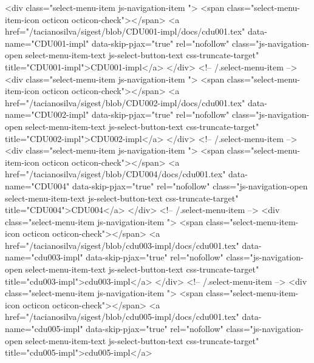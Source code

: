            <div class="select-menu-item js-navigation-item ">
              <span class="select-menu-item-icon octicon octicon-check"></span>
              <a href="/tacianosilva/sigest/blob/CDU001-impl/docs/cdu001.tex"
                 data-name="CDU001-impl"
                 data-skip-pjax="true"
                 rel="nofollow"
                 class="js-navigation-open select-menu-item-text js-select-button-text css-truncate-target"
                 title="CDU001-impl">CDU001-impl</a>
            </div> <!-- /.select-menu-item -->
            <div class="select-menu-item js-navigation-item ">
              <span class="select-menu-item-icon octicon octicon-check"></span>
              <a href="/tacianosilva/sigest/blob/CDU002-impl/docs/cdu001.tex"
                 data-name="CDU002-impl"
                 data-skip-pjax="true"
                 rel="nofollow"
                 class="js-navigation-open select-menu-item-text js-select-button-text css-truncate-target"
                 title="CDU002-impl">CDU002-impl</a>
            </div> <!-- /.select-menu-item -->
            <div class="select-menu-item js-navigation-item ">
              <span class="select-menu-item-icon octicon octicon-check"></span>
              <a href="/tacianosilva/sigest/blob/CDU004/docs/cdu001.tex"
                 data-name="CDU004"
                 data-skip-pjax="true"
                 rel="nofollow"
                 class="js-navigation-open select-menu-item-text js-select-button-text css-truncate-target"
                 title="CDU004">CDU004</a>
            </div> <!-- /.select-menu-item -->
            <div class="select-menu-item js-navigation-item ">
              <span class="select-menu-item-icon octicon octicon-check"></span>
              <a href="/tacianosilva/sigest/blob/cdu003-impl/docs/cdu001.tex"
                 data-name="cdu003-impl"
                 data-skip-pjax="true"
                 rel="nofollow"
                 class="js-navigation-open select-menu-item-text js-select-button-text css-truncate-target"
                 title="cdu003-impl">cdu003-impl</a>
            </div> <!-- /.select-menu-item -->
            <div class="select-menu-item js-navigation-item ">
              <span class="select-menu-item-icon octicon octicon-check"></span>
              <a href="/tacianosilva/sigest/blob/cdu005-impl/docs/cdu001.tex"
                 data-name="cdu005-impl"
                 data-skip-pjax="true"
                 rel="nofollow"
                 class="js-navigation-open select-menu-item-text js-select-button-text css-truncate-target"
                 title="cdu005-impl">cdu005-impl</a>

